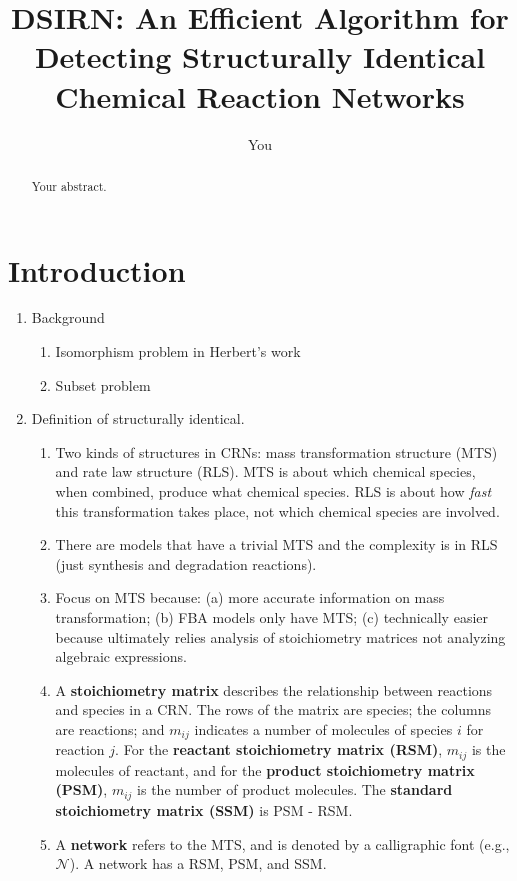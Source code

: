 \documentclass{article}
\title{DSIRN: An Efficient Algorithm for {\bf D}etecting {\bf S}tructurally {\bf I}dentical Chemical {\bf R}eaction {\bf N}etworks}
\author{You}
\begin{document}
\maketitle

\begin{abstract}
Your abstract.
\end{abstract}

\section{Introduction}
\begin{enumerate}
    \item Background
    \begin{enumerate}
        \item Isomorphism problem in Herbert's work
        \item Subset problem
    \end{enumerate}
    \item Definition of structurally identical. 
    \begin{enumerate}
        \item Two kinds of structures in CRNs: mass transformation structure (MTS) and rate law structure (RLS). MTS is about which chemical species, when combined, produce what chemical species. RLS is about how {\em fast} this transformation takes place, not which chemical species are involved.
        \item There are models that have a trivial MTS and the complexity is in RLS (just synthesis and degradation reactions).
        
        \item Focus on MTS because: (a) more accurate information on mass transformation; (b) FBA models only have MTS; (c) technically easier because ultimately relies analysis of stoichiometry matrices not analyzing algebraic expressions.

        \item A {\bf stoichiometry matrix} describes the relationship between reactions and species in a CRN. The rows of the matrix are species; the columns are reactions; and  $m_{ij}$ indicates a number of molecules of species $i$ for reaction $j$. For the {\bf reactant stoichiometry matrix (RSM)}, $m_{ij}$ is the molecules of reactant, and for the {\bf product stoichiometry matrix (PSM)}, $m_{ij}$ is the number of product molecules. The {\bf standard stoichiometry matrix (SSM)} is PSM - RSM.

        \item A {\bf network} refers to the MTS, and is denoted by a calligraphic font (e.g., $\mathcal{N}$). A network has a RSM, PSM, and SSM.
        

\end{enumerate}
\end{enumerate}
\end{document}
